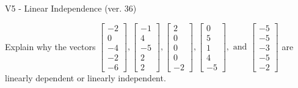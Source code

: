 \begin{exercise}
  \begin{exerciseTitle}V5 - Linear Independence (ver. 36)\end{exerciseTitle}
  \begin{exerciseStatement}
    Explain why the vectors \(\left[\begin{array}{r}
-2 \\
0 \\
-4 \\
-2 \\
-6
\end{array}\right] , \left[\begin{array}{r}
-1 \\
4 \\
-5 \\
2 \\
2
\end{array}\right] , \left[\begin{array}{r}
2 \\
0 \\
0 \\
0 \\
-2
\end{array}\right] , \left[\begin{array}{r}
0 \\
5 \\
1 \\
4 \\
-5
\end{array}\right] , \text{ and } \left[\begin{array}{r}
-5 \\
-5 \\
-3 \\
-5 \\
-2
\end{array}\right]\) are linearly dependent or linearly independent.	



\end{exerciseStatement}
\end{exercise}
